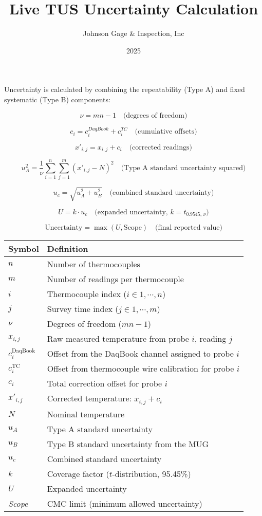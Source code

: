\documentclass{article}
\title{Live TUS Uncertainty Calculation}
\author{Johnson Gage \& Inspection, Inc}
\date{2025}
\begin{document}
\maketitle

Uncertainty is calculated by combining the repeatability (Type A) and fixed systematic (Type B) components:

\[
\nu = m n - 1
\quad \text{(degrees of freedom)}
\]

\[
c_i = c^{DaqBook}_i + c^{TC}_i
\quad\text{(cumulative offsets)}
\]

\[
x'_{i,j} = x_{i,j} + c_i
\quad\text{(corrected readings)}
\]

\[
u_A^2 = \frac{1}{\nu} \sum_{i=1}^{n} \sum_{j=1}^{m} (x'_{i,j} - N)^2
\quad \text{(Type A standard uncertainty squared)}
\]

\[
u_c = \sqrt{u_A^2 + u_B^2}
\quad \text{(combined standard uncertainty)}
\]

\[
U = k \cdot u_c
\quad \text{(expanded uncertainty, } k = t_{0.9545,\, \nu} \text{)}
\]

\[
\text{Uncertainty} = \max(U, \text{Scope})
\quad \text{(final reported value)}
\]

\vspace{1em}
\begin{tabular}{@{}ll@{}}
\toprule
Symbol & Definition \\
\midrule
\( n \)     & Number of thermocouples \\
\( m \)     & Number of readings per thermocouple \\
\( i \)     & Thermocouple index ($i \in 1,\cdots,n$) \\
\( j \)     & Survey time index ($j \in 1,\cdots,m$) \\
\( \nu \)   & Degrees of freedom ($mn - 1$) \\
\( x_{i,j} \) & Raw measured temperature from probe \( i \), reading \( j \) \\
\( c^{\mathrm{DaqBook}}_i \) & Offset from the DaqBook channel assigned to probe \( i \) \\
\( c^{\mathrm{TC}}_i \) & Offset from thermocouple wire calibration for probe \( i \) \\
\( c_i \)   & Total correction offset for probe \( i \) \\
\( x'_{i,j} \) & Corrected temperature: \( x_{i,j} + c_i \) \\
\( N \)     & Nominal temperature \\
\( u_A \)   & Type A standard uncertainty \\
\( u_B \)   & Type B standard uncertainty from the MUG \\
\( u_c \)   & Combined standard uncertainty \\
\( k \)     & Coverage factor (\( t \)-distribution, 95.45\%) \\
\( U \)     & Expanded uncertainty \\
\textit{Scope} & CMC limit (minimum allowed uncertainty) \\
\bottomrule
\end{tabular}
\end{document}
